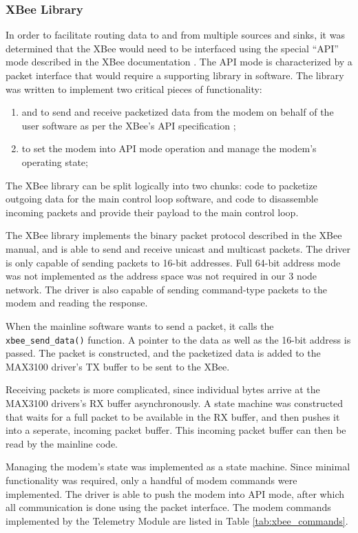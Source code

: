 \subsubsection{XBee Library}

In order to facilitate routing data to and from multiple sources and sinks, it was determined that the XBee would need to be interfaced using the special ``API'' mode described in the XBee documentation \cite{XBeeManual}. The API mode is characterized by a packet interface that would require a supporting library in software. The library was written to implement two critical pieces of functionality:

\begin{enumerate}
\item and to send and receive packetized data from the modem on behalf of the user software as per the XBee's API specification \cite{XBeeManual};
\item to set the modem into API mode operation and manage the modem's operating state;
\end{enumerate}

The XBee library can be split logically into two chunks: code to packetize outgoing data for the main control loop software, and code to disassemble incoming packets and provide their payload to the main control loop.

The XBee library implements the binary packet protocol described in the XBee manual, and is able to send and receive unicast and multicast packets. The driver is only capable of sending packets to 16-bit addresses. Full 64-bit address mode was not implemented as the address space was not required in our 3 node network. The driver is also capable of sending command-type packets to the modem and reading the response.

When the mainline software wants to send a packet, it calls the \verb|xbee_send_data()| function. A pointer to the data as well as the 16-bit address is passed. The packet is constructed, and the packetized data is added to the MAX3100 driver's TX buffer to be sent to the XBee.

Receiving packets is more complicated, since individual bytes arrive at the MAX3100 drivers's RX buffer asynchronously. A state machine was constructed that waits for a full packet to be available in the RX buffer, and then pushes it into a seperate, incoming packet buffer. This incoming packet buffer can then be read by the mainline code.

Managing the modem's state was implemented as a state machine. Since minimal functionality was required, only a handful of modem commands were implemented. The driver is able to push the modem into API mode, after which all communication is done using the packet interface. The modem commands implemented by the Telemetry Module are listed in Table \ref{tab:xbee_commands}.

